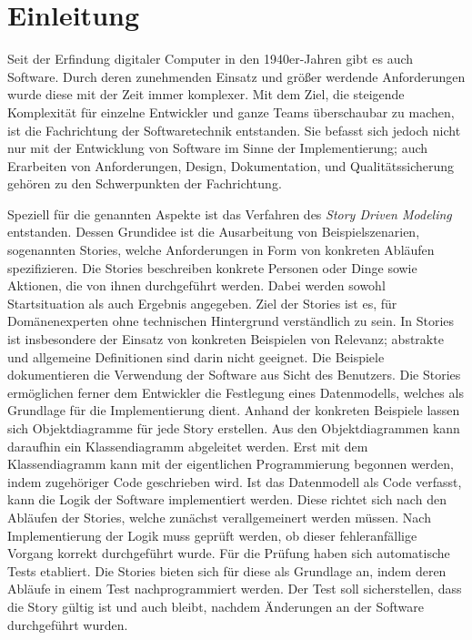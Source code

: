 \chapter{Einleitung}\label{ch:introduction}

Seit der Erfindung digitaler Computer in den 1940er-Jahren gibt es auch Software.
Durch deren zunehmenden Einsatz und größer werdende Anforderungen wurde diese mit der Zeit immer komplexer.
Mit dem Ziel, die steigende Komplexität für einzelne Entwickler und ganze Teams überschaubar zu machen, ist die Fachrichtung der Softwaretechnik entstanden.
Sie befasst sich jedoch nicht nur mit der Entwicklung von Software im Sinne der Implementierung;
auch Erarbeiten von Anforderungen, Design, Dokumentation, und Qualitätssicherung gehören zu den Schwerpunkten der Fachrichtung.

Speziell für die genannten Aspekte ist das Verfahren des \emph{Story Driven Modeling}~\cite{sdm} entstanden.
Dessen Grundidee ist die Ausarbeitung von Beispielszenarien, sogenannten Stories, welche Anforderungen in Form von konkreten Abläufen spezifizieren.
Die Stories beschreiben konkrete Personen oder Dinge sowie Aktionen, die von ihnen durchgeführt werden.
Dabei werden sowohl Startsituation als auch Ergebnis angegeben.
Ziel der Stories ist es, für Domänenexperten ohne technischen Hintergrund verständlich zu sein.
In Stories ist insbesondere der Einsatz von konkreten Beispielen von Relevanz;
abstrakte und allgemeine Definitionen sind darin nicht geeignet.
Die Beispiele dokumentieren die Verwendung der Software aus Sicht des Benutzers.
Die Stories ermöglichen ferner dem Entwickler die Festlegung eines Datenmodells, welches als Grundlage für die Implementierung dient.
Anhand der konkreten Beispiele lassen sich Objektdiagramme für jede Story erstellen.
Aus den Objektdiagrammen kann daraufhin ein Klassendiagramm abgeleitet werden.
Erst mit dem Klassendiagramm kann mit der eigentlichen Programmierung begonnen werden, indem zugehöriger Code geschrieben wird.
Ist das Datenmodell als Code verfasst, kann die Logik der Software implementiert werden.
Diese richtet sich nach den Abläufen der Stories, welche zunächst verallgemeinert werden müssen.
Nach Implementierung der Logik muss geprüft werden, ob dieser fehleranfällige Vorgang korrekt durchgeführt wurde.
Für die Prüfung haben sich automatische Tests etabliert.
Die Stories bieten sich für diese als Grundlage an, indem deren Abläufe in einem Test nachprogrammiert werden.
Der Test soll sicherstellen, dass die Story gültig ist und auch bleibt, nachdem Änderungen an der Software durchgeführt wurden.

